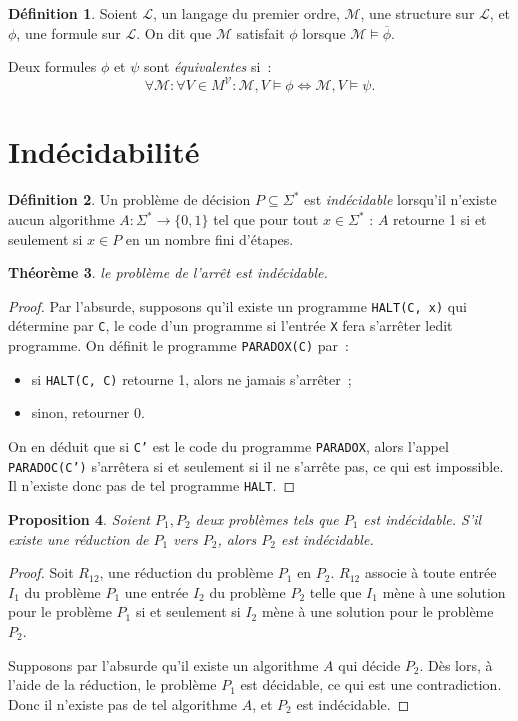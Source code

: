 \documentclass{article}
\newtheorem{thm}{Théorème}[section]
\newtheorem{prp}[thm]{Proposition}
\theoremstyle{definition}
\newtheorem{déf}[thm]{Définition}
\theoremstyle{remark}
\begin{document}
	\begin{déf} Soient $\mathcal L$, un langage du premier ordre, $\mathcal M$, une structure sur $\mathcal L$, et $\phi$, une formule sur $\mathcal L$.
	On dit que $\mathcal M$ satisfait $\phi$ lorsque $\mathcal M \models \overline \phi$.

	Deux formules $\phi$ et $\psi$ sont \textit{équivalentes} si~:
	\[\forall \mathcal M : \forall V \in M^{\mathcal V} : \mathcal M,V \models \phi \Leftrightarrow \mathcal M,V \models \psi.\]
	\end{déf}

\section{Indécidabilité}
	\begin{déf} Un problème de décision $P \subseteq \Sigma^*$ est \textit{indécidable} lorsqu'il n'existe aucun algorithme $A : \Sigma^* \to \{0, 1\}$
	tel que pour tout $x \in \Sigma^*$ : $A$ retourne 1 si et seulement si $x \in P$ en un nombre fini d'étapes.
	\end{déf}

	\begin{thm} le problème de l'arrêt est indécidable.
	\end{thm}

	\begin{proof} Par l'absurde, supposons qu'il existe un programme \texttt{HALT(C, x)} qui détermine par \texttt{C}, le code d'un programme si l'entrée
	\texttt{X} fera s'arrêter ledit programme. On définit le programme \texttt{PARADOX(C)} par~:
	\begin{itemize}
		\item si \texttt{HALT(C, C)} retourne 1, alors ne jamais s'arrêter~;
		\item sinon, retourner 0.
	\end{itemize}

	On en déduit que si \texttt{C'} est le code du programme \texttt{PARADOX}, alors l'appel \texttt{PARADOC(C')} s'arrêtera si et seulement si il
	ne s'arrête pas, ce qui est impossible. Il n'existe donc pas de tel programme \texttt{HALT}.
	\end{proof}

	\begin{prp} Soient $P_1, P_2$ deux problèmes tels que $P_1$ est indécidable. S'il existe une réduction de $P_1$ vers $P_2$, alors $P_2$ est indécidable.
	\end{prp}

	\begin{proof} Soit $R_{12}$, une réduction du problème $P_1$ en $P_2$. $R_{12}$ associe à toute entrée $I_1$ du problème $P_1$ une entrée $I_2$ du
	problème $P_2$ telle que $I_1$ mène à une solution pour le problème $P_1$ si et seulement si $I_2$ mène à une solution pour le problème $P_2$.

	Supposons par l'absurde qu'il existe un algorithme $A$ qui décide $P_2$. Dès lors, à l'aide de la réduction, le problème $P_1$ est décidable, ce qui
	est une contradiction. Donc il n'existe pas de tel algorithme $A$, et $P_2$ est indécidable.
	\end{proof}
\end{document}
